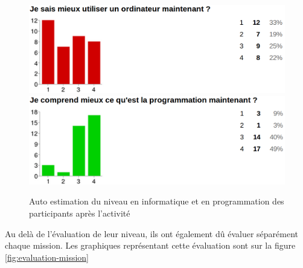 \begin{figure}[ht]
  \begin{center}
    \includegraphics[scale=0.3]{content/8-validation/images/apres}
    \includegraphics[scale=0.3]{content/8-validation/images/apres-programmation}
    \caption{Auto estimation du niveau en informatique et en programmation des participants après l'activité}
    \label{fig:niveau-apres}
  \end{center}
\end{figure}

Au delà de l'évaluation de leur niveau, ils ont également dû évaluer séparément chaque mission. Les graphiques représentant cette évaluation sont sur la figure \ref{fig:evaluation-mission}


